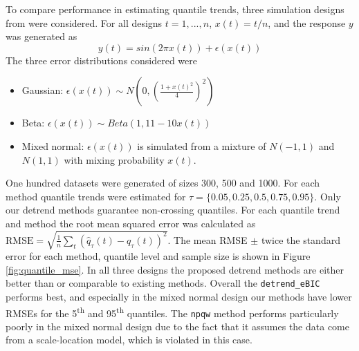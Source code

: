 \documentclass[12pt]{article}
\begin{document}
	To compare performance in estimating quantile trends, three simulation designs from \cite{Racine2017} were considered. For all designs $t = 1, ..., n$,  $x(t) = t/n$, and the response $y$ was generated as 
	$$y(t) = sin(2\pi x(t)) + \epsilon(x(t))$$
	The three error distributions considered were 
	\begin{itemize}
		\item Gaussian: $\epsilon(x(t)) \sim N\left(0, \left(\frac{1+x(t)^2}{4}\right)^2\right)$
		\item Beta: $\epsilon(x(t)) \sim Beta(1, 11-10x(t))$
		\item Mixed normal: $\epsilon(x(t))$ is simulated from a mixture of $N(-1,1)$ and  $N(1,1)$ with mixing probability $x(t)$.
	\end{itemize}
	
	One hundred datasets were generated of sizes 300, 500 and 1000. For each method quantile trends were estimated for $\tau = \{0.05, 0.25, 0.5, 0.75, 0.95\}$. Only our detrend methods guarantee non-crossing quantiles. For each quantile trend and method the root mean squared error was calculated as $\mbox{RMSE} = \sqrt{\frac{1}{n}\sum_t (\hat{q}_{\tau}(t) - q_\tau(t))^2}$. The mean RMSE $\pm$ twice the standard error for each method, quantile level and sample size is shown in Figure \ref{fig:quantile_mse}. 	In all three designs the proposed detrend methods are either better than or comparable to existing methods. Overall the \texttt{detrend\_eBIC} performs best, and especially in the mixed normal design our methods have lower RMSEs for the 5\textsuperscript{th} and 95\textsuperscript{th} quantiles. The \texttt{npqw} method performs particularly poorly in the mixed normal design due to the fact that it assumes the data come from a scale-location model, which is violated in this case. 
	
\end{document}
